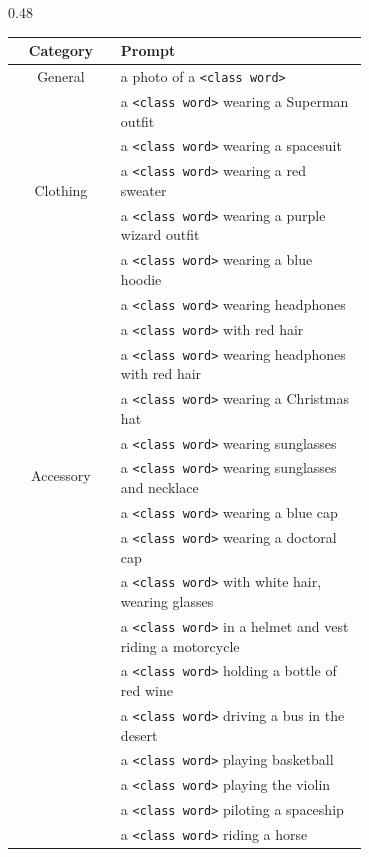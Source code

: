 \begin{table}
    \centering
    \begin{subtable}[h]{0.48\linewidth}
    \centering
    \begin{tabular}{c|p{0.7\linewidth}}
    \toprule
    Category  & Prompt \\
    \midrule
    General  & a photo of a \texttt{<class word>} \\
    \hline
    \multirow{5}{*}{Clothing}   &  a \texttt{<class word>} wearing a Superman outfit \\
         & a \texttt{<class word>} wearing a spacesuit \\
         & a \texttt{<class word>} wearing a red sweater \\
         & a \texttt{<class word>} wearing a purple wizard outfit \\
         & a \texttt{<class word>} wearing a blue hoodie
 \\
\hline
 \multirow{10}{*}{Accessory}&  a \texttt{<class word>} wearing headphones\\
         &  a \texttt{<class word>} with red hair\\
         &  a \texttt{<class word>} wearing headphones with red hair\\
         &  a \texttt{<class word>} wearing a Christmas hat\\
         &  a \texttt{<class word>} wearing sunglasses\\
         &  a \texttt{<class word>} wearing sunglasses and necklace\\
         &  a \texttt{<class word>} wearing a blue cap\\
         &  a \texttt{<class word>} wearing a doctoral cap\\
         &  a \texttt{<class word>} with white hair, wearing glasses\\
\hline
 \multirow{10}{*}{Action}&  a \texttt{<class word>} in a helmet and vest riding a motorcycle\\
         &  a \texttt{<class word>} holding a bottle of red wine\\
         & a \texttt{<class word>} driving a bus in the desert\\
         &  a \texttt{<class word>} playing basketball\\
         &  a \texttt{<class word>} playing the violin\\
         &  a \texttt{<class word>} piloting a spaceship\\
         &  a \texttt{<class word>} riding a horse\\

\end{tabular}
\end{subtable}
\end{table}
